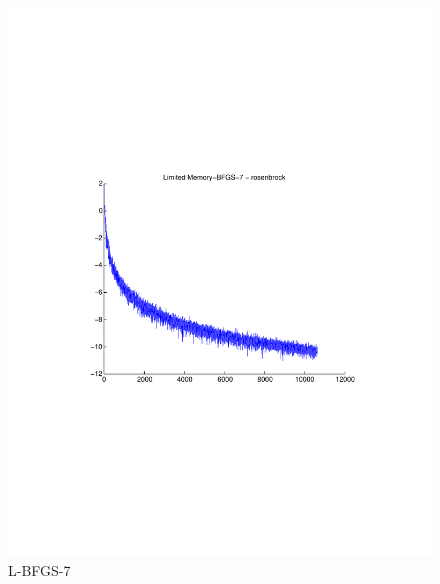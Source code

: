 \documentclass[12pt]{amsart}
\begin{document}
\begin{figure}[thpb]
\centering
\includegraphics[scale=0.60]{images/rosenbrock-20/LBFGS7.pdf}
\caption{L-BFGS-7}
\label{fig:LBFGS7-rosen}
\end{figure}
\end{document}
